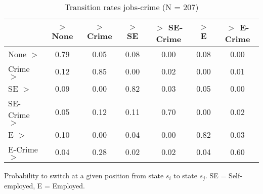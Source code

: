 \begin{table}[htp]
\footnotesize
\setlength{\tabcolsep}{10pt}
\renewcommand{\arraystretch}{1.3}
\begin{threeparttable}
\centering
\caption{Transition rates jobs-crime (N = 207)} 
\label{tab:transition_rates_jobs_crime}
\begin{tabular}{lcccccc}
  \hline
 & $>$ None & $>$ Crime & $>$ SE & $>$ SE-Crime & $>$ E & $>$ E-Crime \\ 
  \hline
None $>$ & 0.79 & 0.05 & 0.08 & 0.00 & 0.08 & 0.00 \\ 
  Crime $>$ & 0.12 & 0.85 & 0.00 & 0.02 & 0.00 & 0.01 \\ 
  SE $>$ & 0.09 & 0.00 & 0.82 & 0.03 & 0.05 & 0.00 \\ 
  SE-Crime $>$ & 0.05 & 0.12 & 0.11 & 0.70 & 0.00 & 0.02 \\ 
  E $>$ & 0.10 & 0.00 & 0.04 & 0.00 & 0.82 & 0.03 \\ 
  E-Crime $>$ & 0.04 & 0.28 & 0.02 & 0.02 & 0.04 & 0.60 \\ 
   \hline
\end{tabular}
\begin{tablenotes}
\scriptsize
\item Probability to switch at a given position from state $s_i$ to state $s_j$. SE = Self-employed, E = Employed.
\end{tablenotes}
\end{threeparttable}
\end{table}
